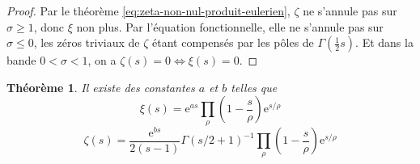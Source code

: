 \documentclass[french]{report}
\newtheorem{theorem}{Théorème}[section]
\begin{document}
\begin{proof}
  Par le théorème \ref{eq:zeta-non-nul-produit-eulerien}, $\zeta$ ne s'annule pas sur $\sigma\geq1$, donc $\xi$ non plus. Par l'équation fonctionnelle, elle ne s'annule pas sur $\sigma\leq0$, les zéros triviaux de $\zeta$ étant compensés par les pôles de $\Gamma(\frac{1}{2}s)$. Et dans la bande $0<\sigma<1$, on a $\zeta(s)=0\Leftrightarrow\xi(s)=0$.
\end{proof}

\begin{theorem}\label{thm:zeta-produit-hadamard}
  Il existe des constantes $a$ et $b$ telles que
  \[ \xi(s)=\mathrm{e}^{as}\prod_{\rho}\left(1-\frac{s}{\rho}\right)\mathrm{e}^{s/\rho} \]
  \[ \zeta(s)=\frac{\mathrm{e}^{bs}}{2(s-1)}\Gamma(s/2+1)^{-1}\prod_{\rho}\left(1-\frac{s}{\rho}\right)\mathrm{e}^{s/\rho} \]
\end{theorem}
\end{document}
